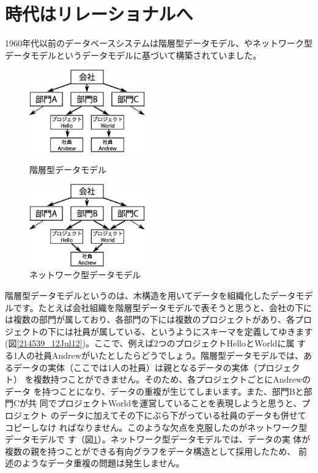 \section{時代はリレーショナルへ}

1960年代以前のデータベースシステムは階層型データモデル、やネットワーク型
データモデルというデータモデルに基づいて構築されていました。

\begin{figure}[tb]
 \begin{minipage}{0.48\textwidth}
  \begin{center}
   \includegraphics[width=5cm]{hayamiz/images/hierarchical-data-model.eps}
   \caption{階層型データモデル}
   \label{214539_12Jul12}
  \end{center}
 \end{minipage}
 \begin{minipage}{0.48\textwidth}
  \begin{center}
   \includegraphics[width=5cm]{hayamiz/images/network-data-model.eps}
   \caption{ネットワーク型データモデル}
   \label{214707_12Jul12}
  \end{center}
 \end{minipage}
\end{figure}

階層型データモデルというのは、木構造を用いてデータを組織化したデータモデ
ルです。たとえば会社組織を階層型データモデルで表そうと思うと、会社の下に
は複数の部門が属しており、各部門の下には複数のプロジェクトがあり、各プロ
ジェクトの下には社員が属している、というようにスキーマを定義してゆきます
(図\ref{214539_12Jul12})。ここで、例えば2つのプロジェクトHelloとWorldに属
する1人の社員Andrewがいたとしたらどうでしょう。階層型データモデルでは、あ
るデータの実体（ここでは1人の社員）は親となるデータの実体（プロジェクト）
を複数持つことができません。そのため、各プロジェクトごとにAndrewのデータ
を持つことになり、データの重複が生じてしまいます。また、部門Bと部門Cが共
同でプロジェクトWorldを運営していることを表現しようと思うと、プロジェクト
のデータに加えてその下にぶら下がっている社員のデータも併せてコピーしなけ
ればなりません。このような欠点を克服したのがネットワーク型データモデルで
す（図\ref{214707_12Jul12}）。ネットワーク型データモデルでは、データの実
体が複数の親を持つことができる有向グラフをデータ構造として採用したため、
前述のようなデータ重複の問題は発生しません。

